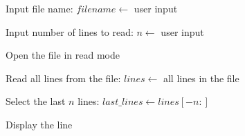 \begin{algorithm}
\caption{Read and Display the Last N Lines of a File}
\begin{algorithmic}[1]

\STATE Input file name:
\STATE $filename \gets$ user input

\STATE Input number of lines to read:
\STATE $n \gets$ user input

\STATE Open the file in read mode

\STATE Read all lines from the file:
\STATE $lines \gets$ all lines in the file

\STATE Select the last $n$ lines:
\STATE $last\_lines \gets lines[-n:]$

    \STATE Display the line
\ENDFOR

\end{algorithmic}
\end{algorithm}